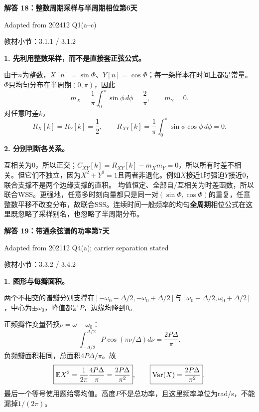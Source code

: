 \documentclass[10.5pt,fontset=fandol]{ctexart}
\newcommand{\E}{\mathbb E}\newcommand{\ee}{\mathrm e}\newcommand{\jj}{\mathrm j}
\newcommand{\qtitle}[2]{\par\addvspace{.85em}\Needspace{10\baselineskip}\begin{tcolorbox}[colback=navy,colframe=navy,arc=1.5pt,boxrule=0pt]\color{white}\large\bfseries #1\hfill\small #2\end{tcolorbox}}
\newcommand{\step}[1]{\par\addvspace{.4em}\Needspace{4\baselineskip}\textbf{#1}\par}\hypersetup{pdftitle={SSA Chapter 3 Review Solutions - Chinese}}
\begin{document}
\qtitle{解答 18：整数周期采样与半周期相位}{第6天}
{\small\color{accentred}Adapted from 202412 Q1(a--c)}\par{\small\color{muted}教材小节：3.1.1 / 3.1.2}\par\smallskip\step{1. 先利用整数采样，而不是直接套正弦公式。}
由于$n$为整数，$X[n]=\sin\Phi$、$Y[n]=\cos\Phi$；每一条样本在时间上都是常量。$\Phi$只均匀分布在半周期$(0,\pi)$，因此
\[\boxed{m_X=\frac1\pi\int_0^\pi\sin\phi\,d\phi=\frac2\pi},\qquad
\boxed{m_Y=0}.\]
对任意时差$k$，
\[\boxed{R_X[k]=R_Y[k]=\frac12},\qquad
\boxed{R_{XY}[k]=\frac1\pi\int_0^\pi\sin\phi\cos\phi\,d\phi=0}.\]
\step{2. 分别判断各关系。}
互相关为0，所以正交；$C_{XY}[k]=R_{XY}[k]-m_Xm_Y=0$，所以所有时差不相关。但它们不独立，因为$X^2+Y^2=1$且两者非退化。例如$X$接近1时强迫$Y$接近0，联合支撑不是两个边缘支撑的直积。
均值恒定、全部自/互相关为时差函数，所以联合WSS。更强地，任意多时刻向量都只是同一对$(\sin\Phi,\cos\Phi)$的重复，任意整数平移不改变分布，故联合SSS。连续时间一般频率的均匀\textbf{全周期}相位公式在这里既忽略了采样别名，也忽略了半周期分布。

\qtitle{解答 19：带通余弦谱的功率}{第7天}
{\small\color{accentred}Adapted from 202112 Q4(a); carrier separation stated}\par{\small\color{muted}教材小节：3.3.2 / 3.4.2}\par\smallskip\step{1. 图形与每瓣面积。}
两个不相交的谱瓣分别支撑在$[-\omega_0-\Delta/2,-\omega_0+\Delta/2]$与$[\omega_0-\Delta/2,\omega_0+\Delta/2]$，中心为$\pm\omega_0$，峰值都是$P$，边缘均降到0。
\begin{center}\end{center}
正频瓣作变量替换$\nu=\omega-\omega_0$：
\[\int_{-\Delta/2}^{\Delta/2}P\cos(\pi\nu/\Delta)d\nu=\frac{2P\Delta}\pi.\]
负频瓣面积相同，总面积$4P\Delta/\pi$。故
\[\boxed{\E X^2=\frac1{2\pi}\frac{4P\Delta}\pi=\frac{2P\Delta}{\pi^2}},\qquad
\boxed{\Var(X)=\frac{2P\Delta}{\pi^2}}.\]
最后一个等号使用题给零均值。高度$P$不是总功率，且这里频率单位为rad/s，不能漏掉$1/(2\pi)$。
\end{document}
